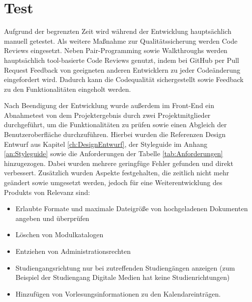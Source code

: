 \section{Test}
\label{ch:Test}
Aufgrund der begrenzten Zeit wird während der Entwicklung hauptsächlich manuell getestet. 
Als weitere Maßnahme zur Qualitätssicherung werden Code Reviews eingesetzt.
Neben Pair-Programming sowie Walkthroughs werden hauptsächlich tool-basierte Code Reviews genutzt, indem bei GitHub per Pull Request Feedback von geeigneten anderen Entwicklern zu jeder Codeänderung eingefordert wird.
Dadurch kann die Codequalität sichergestellt sowie Feedback zu den Funktionalitäten eingeholt werden.

Nach Beendigung der Entwicklung wurde außerdem im Front-End ein Abnahmetest von dem Projektergebnis durch zwei Projektmitglieder durchgeführt, um die Funktionalitäten zu prüfen sowie einen Abgleich der Benutzeroberfläche durchzuführen. 
Hierbei wurden die Referenzen Design Entwurf aus Kapitel \vref{ch:DesignEntwurf}, der Styleguide im Anhang \vref{an:Styleguide} sowie die Anforderungen der Tabelle \ref{tab:Anforderungen} hinzugezogen.
Dabei wurden mehrere geringfüge Fehler gefunden und direkt verbessert.
Zusätzlich wurden Aspekte festgehalten, die zeitlich nicht mehr geändert sowie umgesetzt werden, jedoch für eine Weiterentwicklung des Produkts von Relevanz sind: 

\begin{itemize}
    \item Erlaubte Formate und maximale Dateigröße von hochgeladenen Dokumenten angeben und überprüfen
    \item Löschen von Modulkatalogen 
    \item Entziehen von Administrationsrechten
    \item Studiengangsrichtung nur bei zutreffenden Studiengängen anzeigen (zum Beispiel der Studiengang Digitale Medien hat keine Studienrichtungen)
    \item Hinzufügen von Vorlesungsinformationen zu den Kalendareinträgen.
\end{itemize}
